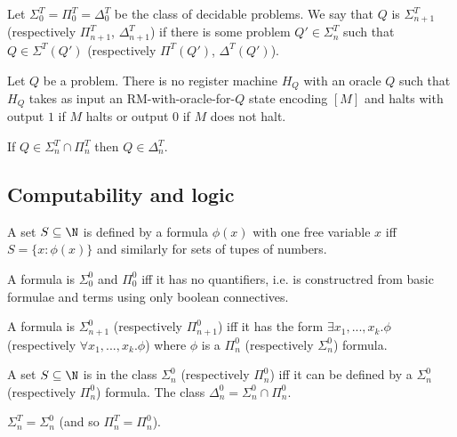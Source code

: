 \documentclass{article}
\begin{document}
\begin{definition}
	Let $\Sigma_0^T=\Pi^T_0=\Delta^T_0$ be the class of decidable problems. We say
	that $Q$ is $\Sigma_{n+1}^T$ (respectively $\Pi_{n+1}^T$, $\Delta_{n+1}^T$)
	if there is some problem $Q'\in\Sigma_n^T$ such that $Q\in\Sigma^T(Q')$
	(respectively $\Pi^T(Q')$, $\Delta^T(Q')$).
\end{definition}

\begin{definition}
	Let $Q$ be a problem. There is no register machine $H_Q$ with an oracle $Q$
	such that $H_Q$ takes as input an RM-with-oracle-for-$Q$ state encoding
	$[M]$ and halts with output $1$ if $M$ halts or output $0$ if $M$ does not halt.
\end{definition}

\begin{theorem}
	If $Q\in\Sigma_n^T\cap\Pi_n^T$ then $Q\in\Delta^T_n$.
\end{theorem}

\subsection{Computability and logic}

\begin{definition}
	A set $S\subseteq\N$ is defined by a formula $\phi(x)$ with one free variable
	$x$ iff $S=\{x:\phi(x)\}$ and similarly for sets of tupes of numbers.
\end{definition}

\begin{definition}
	A formula is $\Sigma_0^0$ and $\Pi_0^0$ iff it has no quantifiers, i.e. is
	constructred from basic formulae and terms using only boolean connectives.

	A formula is $\Sigma_{n+1}^0$ (respectively $\Pi_{n+1}^0$) iff it has the form
	$\exists x_1,...,x_k.\phi$ (respectively $\forall x_1,...,x_k.\phi$) where
	$\phi$ is a $\Pi_n^0$ (respectively $\Sigma_n^0$) formula.
\end{definition}

\begin{definition}
	A set $S\subseteq\N$ is in the class $\Sigma_n^0$ (respectively $\Pi_n^0$)
	iff it can be defined by a $\Sigma_n^0$ (respectively $\Pi_n^0$)
	formula. The class $\Delta_n^0 = \Sigma_n^0\cap\Pi_n^0$.
\end{definition}

\begin{theorem}[Notes I.40]
	$\Sigma_n^T=\Sigma_n^0$ (and so $\Pi_n^T=\Pi_n^0$).
\end{theorem}
\end{document}
